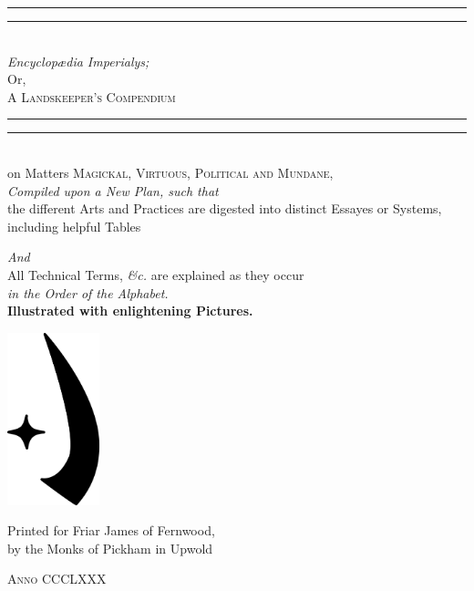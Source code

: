 \documentclass[twoside,9pt,a5paper]{scrbook}
\begin{document}
\pagestyle{plain}

\begin{titlepage}
 \centering
 \vspace*{\baselineskip}
 \rule{\textwidth}{1.4pt}\vspace*{-\baselineskip}\vspace*{2pt}
 \rule{\textwidth}{0.3pt}\\[\baselineskip]
 
 {\Huge \itshape Encyclopædia Imperialys;}\\[0.4em]
 {\Large Or,\\[0.4em]}
 {\huge\scshape A Landskeeper's Compendium}\\
 \rule{\textwidth}{0.4pt}\vspace*{-\baselineskip}\vspace{3.2pt}
 \rule{\textwidth}{1.6pt}\\[\baselineskip]
 {\Large on Matters \scshape Magickal, Virtuous, Political {\normalfont and} Mundane,\\[0.9em]}
 {\itshape Compiled upon a New Plan, such that\\[0.5em]}
 {\large the different Arts and Practices are digested into distinct Essayes or Systems, including helpful Tables}
 
 {\itshape And\\[0.5em]}
 {\large All Technical Terms, \textit{\&c.} are explained as they occur \\[0.5em] \itshape in the Order of the Alphabet.}
 \\[0.9em]
 {\bfseries Illustrated with enlightening Pictures.}
 
 \vfill
 
 \includegraphics[height=5cm]{encyclopedia/Sular.pdf}

 \vfill

 Printed for Friar James of Fernwood,\\[0.4em]
 by the Monks of Pickham in Upwold
 
 {\scshape Anno CCCLXXX}
\end{titlepage}
\end{document}

